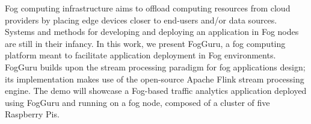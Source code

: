 Fog computing infrastructure aims to offload computing resources from cloud providers by placing edge devices closer to end-users and/or data sources. Systems and methods for developing and deploying an application in Fog nodes are still in their infancy. In this work, we present FogGuru, a fog computing platform meant to facilitate application deployment in Fog environments. FogGuru builds upon the stream processing paradigm for fog applications design; its implementation makes use of the open-source Apache Flink stream processing engine. The demo will showcase a Fog-based traffic analytics application deployed using FogGuru and running on a fog node, composed of a cluster of five Raspberry Pis.
